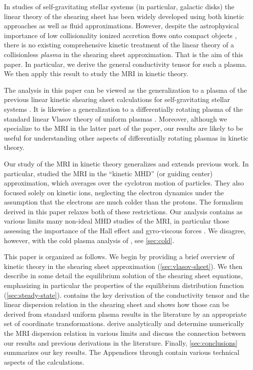 \documentclass[aps,pre,notitlepage,amsmath,amssymb,amsfonts,nobibnotes,nofootinbib,superscriptaddress]{revtex4-1}
\begin{document}
In studies of self-gravitating stellar systems (in particular, galactic disks)
the linear theory of the shearing sheet has been widely developed using both
kinetic approaches as well as fluid approximations. However, despite the
astrophysical importance of low collisionality ionized accretion flows onto
compact objects \citep{Rees1982,Yuan2014}, there is no existing comprehensive
kinetic treatment of the linear theory of a collisionless \emph{plasma} in the
shearing sheet approximation. That is the aim of this paper. In particular, we
derive the general conductivity tensor for such a plasma. We then apply this
result to study the MRI in kinetic theory.

The analysis in this paper can be viewed as the generalization to a plasma of
the previous linear kinetic shearing sheet calculations for self-gravitating
stellar systems \citep[e.g.][]{Julian1966}. It is likewise a generalization to
a differentially rotating plasma of the standard linear Vlasov theory of
uniform plasmas \citep[e.g.][]{Ichimaru1973,Krall1973,Stix1992}. Moreover,
although we specialize to the MRI in the latter part of the paper, our results
are likely to be useful for understanding other aspects of differentially
rotating plasmas in kinetic theory. 

Our study of the MRI in kinetic theory generalizes and extends previous work.
In particular, \citet{Quataert2002} studied the MRI in the ``kinetic MHD'' (or
guiding center) approximation, which averages over the cyclotron motion of
particles. They also focused solely on kinetic ions, neglecting the electron
dynamics under the assumption that the electrons are much colder than the
protons. The formalism derived in this paper relaxes both of these
restrictions. Our analysis contains as various limits many non-ideal MHD
studies of the MRI, in particular those assessing the importance of the Hall
effect \citep[\cref{sec:cold-ions},][]{Wardle1999} and gyro-viscous forces
\citep[\cref{sec:gyro-viscous},][]{Ferraro2007}. We disagree, however, with
the cold plasma analysis of \citet{Krolik2006}, see \cref{sec:cold}.

This paper is organized as follows. We begin by providing a brief overview of
kinetic theory in the  shearing sheet approximation (\cref{sec:vlasov-sheet}).
We then describe in some detail the equilibrium solution of the shearing sheet
equations, emphasizing in particular the properties of the equilibrium
distribution function (\cref{sec:steady-state}).
 contains the key derivation of the conductivity
tensor and the linear dispersion relation in the shearing sheet and shows how
those can be derived from standard uniform plasma results in the literature by
an appropriate set of coordinate transformations.
 derive analytically and determine
numerically the MRI dispersion relation in various limits and discuss the
connection between our results and previous derivations in the literature.
Finally, \cref{sec:conclusions} summarizes our key results. The Appendices
 through 
contain various technical aspects of the calculations.
\end{document}
